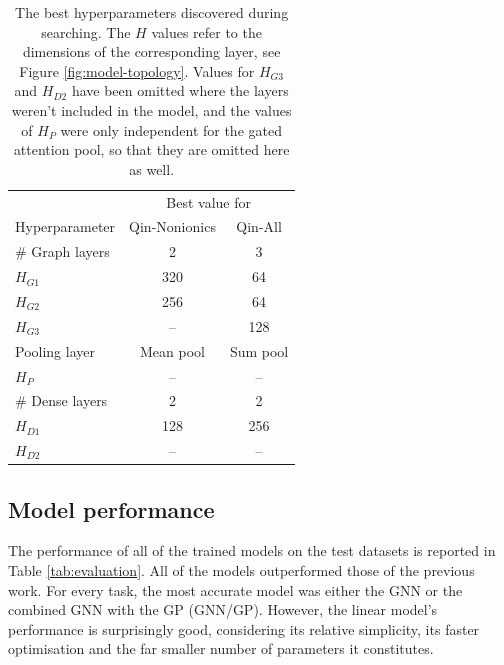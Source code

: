 \begin{table}
    \centering
    \caption{The best hyperparameters discovered during searching. The $H$
        values refer to the dimensions of the corresponding layer, see Figure
        \ref{fig:model-topology}. Values for $H_{G3}$ and $H_{D2}$ have been
        omitted where the layers weren't included in the model, and the values
        of $H_P$ were only independent for the gated attention pool, so that
        they are omitted here as well.}
    \label{tab:hb-hps}
    \begin{tabular}{@{}lcc@{}} \toprule
                        & \multicolumn{2}{c}{Best value for}            \\\cmidrule(l){2-3}
        Hyperparameter  & Qin-Nonionics                      & Qin-All  \\\midrule
        \# Graph layers & 2                                  & 3        \\
        $H_{G1}$        & 320                                & 64       \\
        $H_{G2}$        & 256                                & 64       \\
        $H_{G3}$        & --                                 & 128      \\
        Pooling layer   & Mean pool                          & Sum pool \\
        $H_P$           & --                                 & --       \\
        \# Dense layers & 2                                  & 2        \\
        $H_{D1}$        & 128                                & 256      \\
        $H_{D2}$        & --                                 & --       \\\bottomrule
    \end{tabular}
\end{table}

\subsection{Model performance}

The performance of all of the trained models on the test datasets is reported in
Table \ref{tab:evaluation}. All of the models outperformed those of the previous
work. For every task, the most accurate model was either the GNN or the combined
GNN with the GP (GNN/GP). However, the linear model's performance is surprisingly good,
considering its relative simplicity, its faster optimisation and the far smaller
number of parameters it constitutes.

